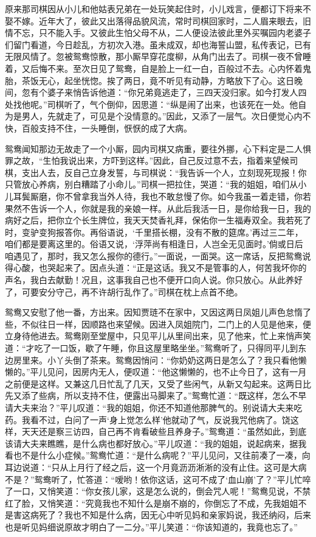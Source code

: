 \documentclass[12pt,oneside]{book}
\begin{document}
原来那司棋因从小儿和他姑表兄弟在一处玩笑起住时，小儿戏言，便都订下将来不娶不嫁。近年大了，彼此又出落得品貌风流，常时司棋回家时，二人眉来眼去，旧情不忘，只不能入手。又彼此生怕父母不从，二人便设法彼此里外买嘱园内老婆子们留门看道，今日趁乱，方初次入港。虽未成双，却也海誓山盟，私传表记，已有无限风情了。忽被鸳鸯惊散，那小厮早穿花度柳，从角门出去了。司棋一夜不曾睡着，又后悔不来。至次日见了鸳鸯，自是脸上一红一白，百般过不去。心内怀着鬼胎，茶饭无心，起坐恍惚。挨了两日，竟不听见有动静，方略放下了心。这日晚间，忽有个婆子来悄告诉他道：“你兄弟竟逃走了，三四天没归家。如今打发人四处找他呢。”司棋听了，气个倒仰，因思道：“纵是闹了出来，也该死在一处。他自为是男人，先就走了，可见是个没情意的。”因此，又添了一层气。次日便觉心内不快，百般支持不住，一头睡倒，恹恹的成了大病。

鸳鸯闻知那边无故走了一个小厮，园内司棋又病重，要往外挪，心下料定是二人惧罪之故，“生怕我说出来，方吓到这样。”因此，自己反过意不去，指着来望候司棋，支出人去，反自己立身发誓，与司棋说：“我告诉一个人，立刻现死现报！你只管放心养病，别白糟踏了小命儿。”司棋一把拉住，哭道：“我的姐姐，咱们从小儿耳鬓厮磨，你不曾拿我当外人待，我也不敢怠慢了你。如今我虽一着走错，你若果然不告诉一个人，你就是我的亲娘一样。从此后我活一日，是你给我一日，我的病好之后，把你立个长生牌位，我天天焚香礼拜，保佑你一生福寿双全。我若死了时，变驴变狗报答你。再俗语说，‘千里搭长棚，没有不散的筵席。’再过三二年，咱们都是要离这里的。俗语又说，‘浮萍尚有相逢日，人岂全无见面时。’倘或日后咱遇见了，那时，我又怎么报你的德行。”一面说，一面哭。这一席话，反把鸳鸯说得心酸，也哭起来了。因点头道：“正是这话。我又不是管事的人，何苦我坏你的声名，我白去献勤！况且，这事我自己也不便开口向人说。你只放心。从此养好了，可要安分守己，再不许胡行乱作了。”司棋在枕上点首不绝。

鸳鸯又安慰了他一番，方出来。因知贾琏不在家中，又因这两日凤姐儿声色怠惰了些，不似往日一样，因顺路也来望候。因进入凤姐院门，二门上的人见是他来，便立身待他进去。鸳鸯刚至堂屋中，只见平儿从里间出来，见了他来，忙上来悄声笑道：“才吃了一口饭，歇了午睡，你且这屋里略坐坐。”鸳鸯听了，只得同平儿到东边房里来。小丫头倒了茶来。鸳鸯因悄问：“你奶奶这两日是怎么了？我只看他懒懒的。”平儿见问，因房内无人，便叹道：“他这懒懒的，也不止今日了，这有一月之前便是这样。又兼这几日忙乱了几天，又受了些闲气，从新又勾起来。这两日比先又添了些病，所以支持不住，便露出马脚来了。”鸳鸯忙道：“既这样，怎么不早请大夫来治？”平儿叹道：“我的姐姐，你还不知道他那脾气的。别说请大夫来吃药。我看不过，白问了一声‘身上觉怎么样’他就动了气，反说我咒他病了。饶这样，天天还是察三访四，自己再不肯看破些且养身子。”鸳鸯道：“虽然如此，到底该请大夫来瞧瞧，是什么病也都好放心。”平儿叹道：“我的姐姐，说起病来，据我看也不是什么小症候。”鸳鸯忙道：“是什么病呢？”平儿见问，又往前凑了一凑，向耳边说道：“只从上月行了经之后，这一个月竟沥沥淅淅的没有止住。这可是大病不是？”鸳鸯听了，忙答道：“嗳哟！依你这话，这可不成了‘血山崩’了？”平儿忙啐了一口，又悄笑道：“你女孩儿家，这是怎么说的，倒会咒人呢！”鸳鸯见说，不禁红了脸，又悄笑道：“究竟我也不知什么是崩不崩的，你倒忘了不成，先我姐姐不是害这病死了？我也不知是什么病，因无心中听见妈和亲家妈说，我还纳闷，后来也是听见妈细说原故才明白了一二分。”平儿笑道：“你该知道的，我竟也忘了。”
\end{document}
